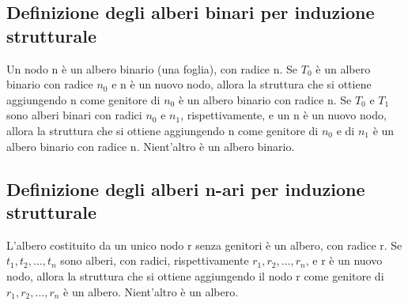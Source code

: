 \documentclass{article}
\numberwithin{equation}{subsection}
\begin{document}
\subsection{Definizione degli alberi binari per induzione strutturale}
Un nodo n è un albero binario (una foglia), con radice n. Se $T_0$ è un albero binario con radice $n_0$ e n è un nuovo nodo, allora la struttura che si ottiene aggiungendo n come genitore di $n_0$ è un albero binario con radice n. Se $T_0$ e $T_1$ sono alberi binari con radici $n_0$ e $n_1$, rispettivamente, e un n è un nuovo nodo, allora la struttura che si ottiene aggiungendo n come genitore di $n_0$ e di $n_1$ è un albero binario con radice n. Nient'altro è un albero binario.
\subsection{Definizione degli alberi n-ari per induzione strutturale}
L'albero costituito da un unico nodo r senza genitori è un albero, con radice r. Se $t_1,t_2,...,t_n$ sono alberi, con radici, rispettivamente $r_1,r_2,...,r_n$, e r è un nuovo nodo, allora la struttura che si ottiene aggiungendo il nodo r come genitore di $r_1,r_2,...,r_n$ è un albero. Nient'altro è un albero.

\clearpage
\end{document}
